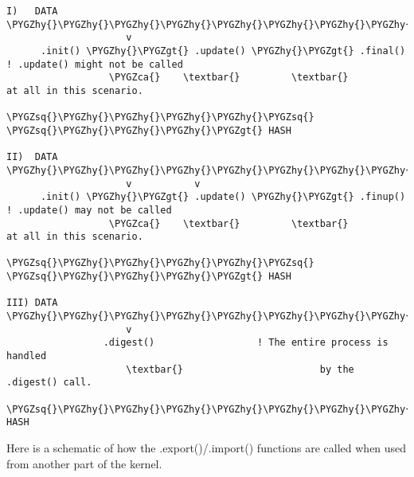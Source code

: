 \documentclass[a4paper,8pt,english]{sphinxmanual}
\def\PYGZca{\char`\^}
\def\PYGZgt{\char`\>}
\def\PYGZhy{\char`\-}
\def\PYGZsq{\char`\'}
\renewcommand\PYGZsq{\textquotesingle}
\begin{document}
\begin{Verbatim}[commandchars=\\\{\}]
I)   DATA \PYGZhy{}\PYGZhy{}\PYGZhy{}\PYGZhy{}\PYGZhy{}\PYGZhy{}\PYGZhy{}\PYGZhy{}\PYGZhy{}\PYGZhy{}\PYGZhy{}.
                     v
      .init() \PYGZhy{}\PYGZgt{} .update() \PYGZhy{}\PYGZgt{} .final()      ! .update() might not be called
                  \PYGZca{}    \textbar{}         \textbar{}            at all in this scenario.
                  \PYGZsq{}\PYGZhy{}\PYGZhy{}\PYGZhy{}\PYGZhy{}\PYGZsq{}         \PYGZsq{}\PYGZhy{}\PYGZhy{}\PYGZhy{}\PYGZgt{} HASH

II)  DATA \PYGZhy{}\PYGZhy{}\PYGZhy{}\PYGZhy{}\PYGZhy{}\PYGZhy{}\PYGZhy{}\PYGZhy{}\PYGZhy{}\PYGZhy{}\PYGZhy{}.\PYGZhy{}\PYGZhy{}\PYGZhy{}\PYGZhy{}\PYGZhy{}\PYGZhy{}\PYGZhy{}\PYGZhy{}\PYGZhy{}\PYGZhy{}\PYGZhy{}.
                     v           v
      .init() \PYGZhy{}\PYGZgt{} .update() \PYGZhy{}\PYGZgt{} .finup()      ! .update() may not be called
                  \PYGZca{}    \textbar{}         \textbar{}            at all in this scenario.
                  \PYGZsq{}\PYGZhy{}\PYGZhy{}\PYGZhy{}\PYGZhy{}\PYGZsq{}         \PYGZsq{}\PYGZhy{}\PYGZhy{}\PYGZhy{}\PYGZgt{} HASH

III) DATA \PYGZhy{}\PYGZhy{}\PYGZhy{}\PYGZhy{}\PYGZhy{}\PYGZhy{}\PYGZhy{}\PYGZhy{}\PYGZhy{}\PYGZhy{}\PYGZhy{}.
                     v
                 .digest()                  ! The entire process is handled
                     \textbar{}                        by the .digest() call.
                     \PYGZsq{}\PYGZhy{}\PYGZhy{}\PYGZhy{}\PYGZhy{}\PYGZhy{}\PYGZhy{}\PYGZhy{}\PYGZhy{}\PYGZhy{}\PYGZhy{}\PYGZhy{}\PYGZhy{}\PYGZhy{}\PYGZhy{}\PYGZhy{}\PYGZgt{} HASH
\end{Verbatim}

Here is a schematic of how the .export()/.import() functions are called
when used from another part of the kernel.
\end{document}
